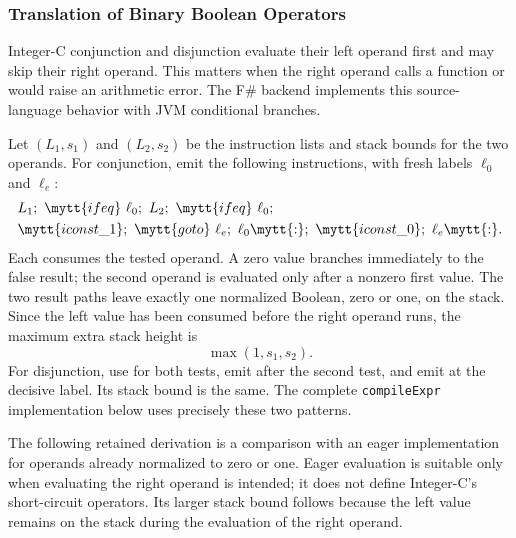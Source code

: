 \subsubsection{Translation of Binary Boolean Operators} Integer-C conjunction and disjunction evaluate their left operand first and may skip their right operand.
This matters when the right operand calls a function or would raise an arithmetic error.
The F\# backend implements this source-language behavior with JVM conditional branches.

Let $(L_1,s_1)$ and $(L_2,s_2)$ be the instruction lists and stack bounds for the two operands.
For conjunction, emit the following instructions, with fresh labels $\ell_0$ and $\ell_e$: \[
\begin{aligned}
&L_1;\ \mytt{ifeq}\ \ell_0;\ L_2;\ \mytt{ifeq}\ \ell_0;\\ &\mytt{iconst\_1};\ \mytt{goto}\ \ell_e;\ \ell_0\mytt{:};\ \mytt{iconst\_0};\ \ell_e\mytt{:}.
\end{aligned}
\] Each  consumes the tested operand.
A zero value branches immediately to the false result; the second operand is evaluated only after a nonzero first value.
The two result paths leave exactly one normalized Boolean, zero or one, on the stack.
Since the left value has been consumed before the right operand runs, the maximum extra stack height is \[ \max(1,s_1,s_2).
\] For disjunction, use  for both tests, emit  after the second test, and emit  at the decisive label.
Its stack bound is the same.
The complete \texttt{compileExpr} implementation below uses precisely these two patterns.

The following retained derivation is a comparison with an eager implementation for operands already normalized to zero or one.
Eager evaluation is suitable only when evaluating the right operand is intended; it does not define Integer-C's short-circuit operators.
Its larger stack bound follows because the left value remains on the stack during the evaluation of the right operand.

